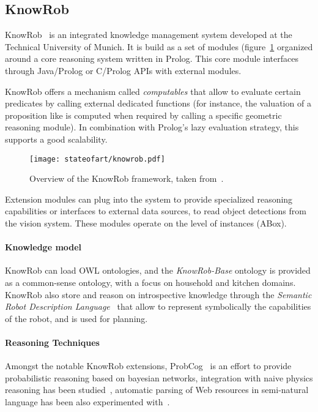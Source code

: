 \subsection{KnowRob}
\label{sect|knowrob}


{\sc KnowRob}~\cite{Tenorth2009a} is an integrated knowledge management system
developed at the Technical University of Munich. It is build as a set of
modules (figure~\ref{fig|knowrob} organized around a core reasoning system
written in Prolog. This core module interfaces through Java/Prolog or
C/Prolog APIs with external modules.

{\sc KnowRob} offers a mechanism called \emph{computables} that allow to
evaluate certain predicates by calling external dedicated functions (for
instance, the valuation of a proposition like  is
computed when required by calling a specific geometric reasoning module). In
combination with Prolog's lazy evaluation strategy, this supports a good
scalability.

\begin{figure}
    \centering
    \texttt{[image: stateofart/knowrob.pdf]}

    \caption{Overview of the {\sc KnowRob} framework, taken
    from~\cite{Tenorth2011}.}

    \label{fig|knowrob}
\end{figure}

Extension modules can plug into the system to provide specialized reasoning
capabilities or interfaces to external data sources, \eg to read object
detections from the vision system. These modules operate on the level of
instances (ABox).

\paragraph{Knowledge model} {\sc KnowRob} can load OWL ontologies, and the
\emph{KnowRob-Base} ontology is provided as a common-sense ontology, with a
focus on household and kitchen domains. {\sc KnowRob} also store and reason on
introspective knowledge through the \emph{Semantic Robot Description
Language}~\cite{Kunze2011} that allow to represent symbolically the
capabilities of the robot, and is used for planning.


\paragraph{Reasoning Techniques} Amongst the notable {\sc KnowRob} extensions,
{\sc ProbCog}~\cite{Jain2009} is an effort to provide probabilistic reasoning
based on bayesian networks, integration with naive physics reasoning has been
studied~\cite{Kunze2011a}, automatic parsing of Web resources in semi-natural
language has been also experimented with~\cite{Nyga2009}.

